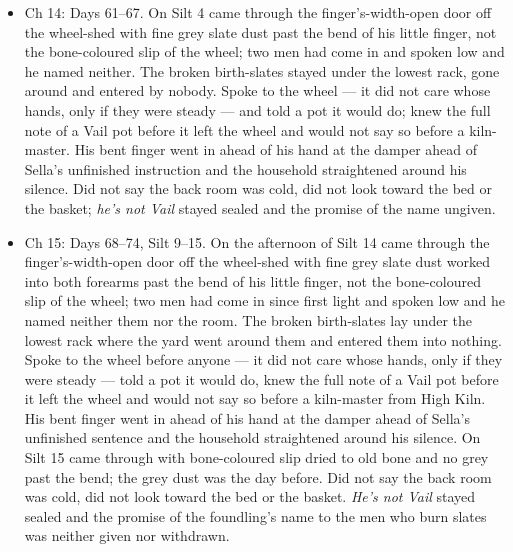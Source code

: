 \documentclass{design/chronicle}
\begin{document}
{\begin{itemize}[leftmargin=1.4em,itemsep=1pt,topsep=3pt,parsep=0pt]
\end{itemize}

\begin{itemize}[leftmargin=1.4em,itemsep=1pt,topsep=3pt,parsep=0pt]

\item Ch 14: Days 61–67. On Silt 4 came through the finger’s-width-open door off the wheel-shed with fine grey slate dust past the bend of his little finger, not the bone-coloured slip of the wheel; two men had come in and spoken low and he named neither. The broken birth-slates stayed under the lowest rack, gone around and entered by nobody. Spoke to the wheel — it did not care whose hands, only if they were steady — and told a pot it would do; knew the full note of a Vail pot before it left the wheel and would not say so before a kiln-master. His bent finger went in ahead of his hand at the damper ahead of Sella’s unfinished instruction and the household straightened around his silence. Did not say the back room was cold, did not look toward the bed or the basket; \emph{he’s not Vail} stayed sealed and the promise of the name ungiven.

\end{itemize}

\begin{itemize}[leftmargin=1.4em,itemsep=1pt,topsep=3pt,parsep=0pt]

\item Ch 15: Days 68–74, Silt 9–15. On the afternoon of Silt 14 came through the finger’s-width-open door off the wheel-shed with fine grey slate dust worked into both forearms past the bend of his little finger, not the bone-coloured slip of the wheel; two men had come in since first light and spoken low and he named neither them nor the room. The broken birth-slates lay under the lowest rack where the yard went around them and entered them into nothing. Spoke to the wheel before anyone --- it did not care whose hands, only if they were steady --- told a pot it would do, knew the full note of a Vail pot before it left the wheel and would not say so before a kiln-master from High Kiln. His bent finger went in ahead of his hand at the damper ahead of Sella’s unfinished sentence and the household straightened around his silence. On Silt 15 came through with bone-coloured slip dried to old bone and no grey past the bend; the grey dust was the day before. Did not say the back room was cold, did not look toward the bed or the basket. \emph{He’s not Vail} stayed sealed and the promise of the foundling’s name to the men who burn slates was neither given nor withdrawn.


\end{itemize}}
\end{document}
